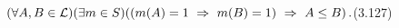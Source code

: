 \hsize=11cm
\parindent=0pt
\nopagenumbers
$(\forall A,B\in{\cal L})(\exists m \in S)((m(A)=1\ \Rightarrow
\ m(B)=1)\ \Rightarrow\ A\le B)\,.$\hfill (3.127)

\bye
